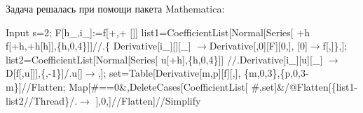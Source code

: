 \documentclass[a4paper]{article}
\begin{document}
\begin{sol}
Задача решалась при помощи пакета Mathematica:

\begin{mmaCell}[moredefined={s, F, list1, list2, set},morepattern={h_, i_, j_, \#},morefunctionlocal={i, h, j, m, p}]{Input}
  s=2;
  F[h_,i_]:=f[+,+ []]
  list1=CoefficientList[Normal[Series[
  +h f[+h,+h[h]],\{h,0,4\}]]//.\{
  Derivative[i_][][_] \(\pmb{\to}\)Derivative[,0][F][0,],
  [0]\(\pmb{\to}\)f[,]\},];
  list2=CoefficientList[Normal[Series[
  u[+h],\{h,0,4\}]]
  //.Derivative[i_][u][_] \(\pmb{\to}\)  
  D[f[,u[]],\{,-1\}]/.u[]\(\pmb{\to}\),];
  set=Table[Derivative[m,p][f][,],
  \{m,0,3\},\{p,0,3-m\}]//Flatten;
  Map[#==0&,DeleteCases[CoefficientList[
  #,set]&/@Flatten[\{list1-list2//Thread\}/.\(\pmb{\to}\)
  ],0,\mmaDef{\(\pmb{\infty}\)}]//Flatten]//Simplify
\end{mmaCell}


\end{sol}
\end{document}
